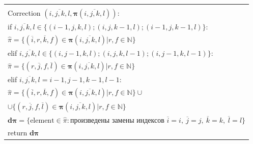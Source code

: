 \begin{multicols}{2}
\begin{figure*}[b]
\vspace*{6pt}
{\small 
\begin{center}
\begin{tabular}{l}
\hline
\\[-9pt]
Correction $(\overline{i,j,k,l}, \boldsymbol{\pi}(\overline{i,j,k,l})):$\\
\hspace*{3mm}if $\overline{i,j,k,l} \in \{ (i-1, j, k,l)  ;  
(i, j, k-1, l)  ;  (i-1, j, k-1, l) \}$:\\
\hspace*{6mm}$ \widehat{\pi} = \{ (\overline{i}, r, \overline{k}, f) \in 
\boldsymbol{\pi}(\overline{i, j, k, l}) \vert r, f \in \mathbb{N} \}$\\
\hspace*{3mm}elif $\overline{i,j,k,l}\in \{  
(i, j-1, k, l); (i, j, k, l-1); (i, j-1, k, l-1) \}$:\\
\hspace*{6mm}$\widehat{\pi} = \{ (r, \overline{j}, f, \overline{l}) 
\in \boldsymbol{\pi}(\overline{i, j, k, l}) \vert r, f \in \mathbb{N} \}$\\
\hspace*{3mm}elif $\overline{i,j,k,l} =  i-1,j-1,k-1,l-1:$\\
\hspace*{6mm}$\widehat{\pi} = \{ (\overline{i}, r, \overline{k}, f) 
\in \boldsymbol{\pi}(\overline{i, j, k, l}) \vert r,f \in \mathbb{N} \} \cup$\\
\hspace*{6mm}$\cup \{ (r, \overline{j}, f, \overline{l}) \in \boldsymbol{\pi}
(\overline{i, j, k, l}) \vert r,f \in \mathbb{N} \}$\\
\hspace*{3mm}$\boldsymbol{d\pi} = \{ \mathrm{element} \in \widehat{\pi}: 
\mbox{произведены\ замены\ индексов } 
\overline{i} = i,\ \overline{j} = j,\ \overline{k} = k,\ \overline{l} = l \}$\\
return $\boldsymbol{d\pi}$\\
\hline
\end{tabular}
\end{center}
}
\vspace*{-9pt}

\end{figure*}



\end{multicols}
